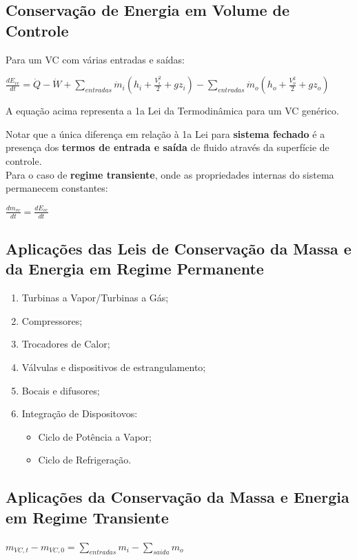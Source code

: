 \documentclass[a4paper, 12pt]{article}
\begin{document}
\subsection{Conservação de Energia em Volume de Controle}
Para um VC com várias entradas e saídas:
	\begin{center}
		\large
		$ \frac{dE_{vc}}{dt} = \dot{Q} - \dot{W} + \sum\limits_{entradas}\dot{m}_i(h_i + \frac{V_i^2}{2} + gz_i) - \sum\limits_{entradas}\dot{m}_o(h_o + \frac{V_o^2}{2} + gz_o) $
	\end{center}
A equação acima representa a 1a Lei da Termodinâmica para um VC genérico.

Notar que a única diferença em relação à 1a Lei para \textbf{sistema fechado} é a
presença dos \textbf{termos de entrada e saída} de fluido através da superfície de
controle.\\

Para o caso de \textbf{regime transiente}, onde as propriedades internas do sistema permanecem constantes:
	\begin{center}
		\large
		$ \frac{dm_{vc}}{dt} = \frac{dE_{vc}}{dt}$
	\end{center}

\subsection{Aplicações das Leis de Conservação da Massa e da Energia em Regime Permanente}
	\begin{enumerate}
		\item Turbinas a Vapor/Turbinas a Gás;
		\item Compressores;
		\item Trocadores de Calor;
		\item Válvulas e dispositivos de estrangulamento;
		\item Bocais e difusores;
		\item Integração de Dispositovos:
			\begin{itemize}
				\item Ciclo de Potência a Vapor;
				\item Ciclo de Refrigeração.
			\end{itemize}
	\end{enumerate}


\subsection{Aplicações da Conservação da Massa e Energia em Regime Transiente}
	\begin{center}
		\large
		$ m_{VC,t} - m_{VC,0} = \sum\limits_{entradas}m_i - \sum\limits_{saida}m_o$
	\end{center}
\end{document}
